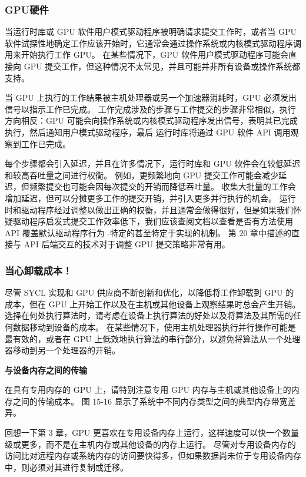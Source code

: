 \subsubsection{GPU硬件}
当运行时库或 GPU 软件用户模式驱动程序被明确请求提交工作时，或者当 GPU 软件试探性地确定工作应该开始时，它通常会通过操作系统或内核模式驱动程序调用来开始执行工作 GPU。 在某些情况下，GPU 软件用户模式驱动程序可能会直接向 GPU 提交工作，但这种情况不太常见，并且可能并非所有设备或操作系统都支持。

当 GPU 上执行的工作结果被主机处理器或另一个加速器消耗时，GPU 必须发出信号以指示工作已完成。 工作完成涉及的步骤与工作提交的步骤非常相似，执行方向相反：GPU 可能会向操作系统或内核模式驱动程序发出信号，表明其已完成执行，然后通知用户模式驱动程序，最后 运行时库将通过 GPU 软件 API 调用观察到工作已完成。

每个步骤都会引入延迟，并且在许多情况下，运行时库和 GPU 软件会在较低延迟和较高吞吐量之间进行权衡。 例如，更频繁地向 GPU 提交工作可能会减少延迟，但频繁提交也可能会因每次提交的开销而降低吞吐量。 收集大批量的工作会增加延迟，但可以分摊更多工作的提交开销，并引入更多并行执行的机会。 运行时和驱动程序经过调整以做出正确的权衡，并且通常会做得很好，但是如果我们怀疑驱动程序启发式提交工作效率低下，我们应该查阅文档以查看是否有方法使用 API 覆盖默认驱动程序行为 -特定的甚至特定于实现的机制。 第 20 章中描述的直接与 API 后端交互的技术对于调整 GPU 提交策略非常有用。

\subsubsection{当心卸载成本！}
尽管 SYCL 实现和 GPU 供应商不断创新和优化，以降低将工作卸载到 GPU 的成本，但在 GPU 上开始工作以及在主机或其他设备上观察结果时总会产生开销。 选择在何处执行算法时，请考虑在设备上执行算法的好处以及将算法及其所需的任何数据移动到设备的成本。 在某些情况下，使用主机处理器执行并行操作可能是最有效的，或者在 GPU 上低效地执行算法的串行部分，以避免将算法从一个处理器移动到另一个处理器的开销。

\textbf{与设备内存之间的传输}

在具有专用内存的 GPU 上，请特别注意专用 GPU 内存与主机或其他设备上的内存之间的传输成本。 图 15-16 显示了系统中不同内存类型之间的典型内存带宽差异。

回想一下第 3 章，GPU 更喜欢在专用设备内存上运行，这样速度可以快一个数量级或更多，而不是在主机内存或其他设备的内存上运行。 尽管对专用设备内存的访问比对远程内存或系统内存的访问要快得多，但如果数据尚未位于专用设备内存中，则必须对其进行复制或迁移。

